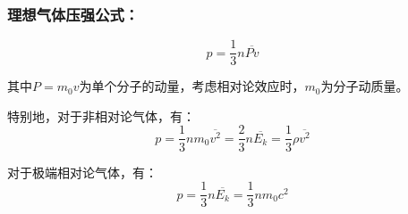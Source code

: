 \documentclass[zihao=-4,UTF8]{report}
\begin{document}
\subsubsection{理想气体压强公式：}\noindent
\begin{equation}
    p= \frac{1}{3}n \overline{Pv} 
    \label{理想气体压强公式}
\end{equation}\par
{\color{gray}\small 其中$P = m_0v$为单个分子的动量，考虑相对论效应时，$m_0$为分子动质量。}\par
特别地，对于非相对论气体，有：
\begin{equation}
    p = \frac{1}{3}nm_0\overline{v^2} = \frac{2}{3}n\overline{E_k} = \frac{1}{3}\rho \overline{v^2} 
\end{equation}\par
对于极端相对论气体，有：
\begin{equation}
    p = \frac{1}{3}n\overline{E_k} = \frac{1}{3}nm_0c^2
\end{equation}
\end{document}
